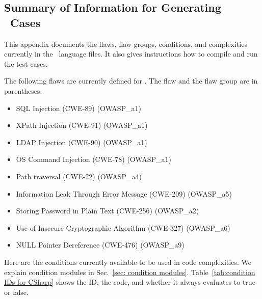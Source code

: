 \clearpage

\begin{appendices}

\section{Summary of Information for Generating \CSharp\ Cases}
\label{sec:CSharp language}

This appendix documents the flaws, flaw groups, conditions, and complexities
currently in the
\CSharp\ language files.
It also gives instructions how to compile and run the test cases.

The following flaws are currently defined for \CSharp.
The flaw and the flaw group are in parentheses.
\begin{itemize}[nosep]
    \item SQL Injection (CWE-89)
        (OWASP\_a1)
    \item XPath Injection (CWE-91)
        (OWASP\_a1)
    \item LDAP Injection (CWE-90)
        (OWASP\_a1)
    \item OS Command Injection (CWE-78)
        (OWASP\_a1)
    \item Path traversal (CWE-22)
        (OWASP\_a4)
    \item Information Leak Through Error Message (CWE-209)
        (OWASP\_a5)
    \item Storing Password in Plain Text (CWE-256)
        (OWASP\_a2)
    \item Use of Insecure Cryptographic Algorithm (CWE-327)
        (OWASP\_a6)
    \item NULL Pointer Dereference (CWE-476)
        (OWASP\_a9)
\end{itemize}

Here are the conditions currently available to be used in code complexities.
We explain condition modules in Sec.~\ref{sec: condition modules}.
Table~\ref{tab:condition IDs for CSharp} shows the ID, the code, and whether it
always evaluates to true or false.


\end{appendices}
